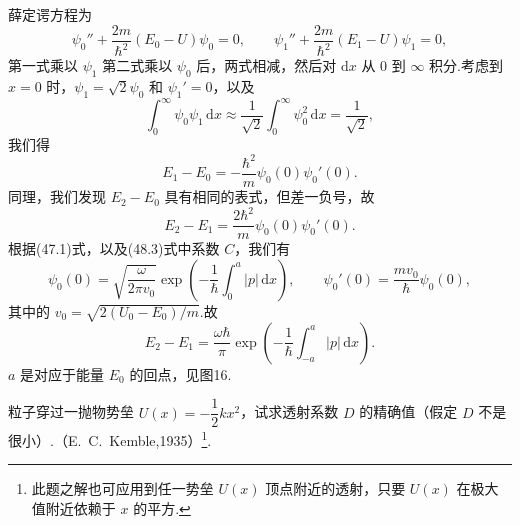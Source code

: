 \begin{xiti}
薛定谔方程为
\begin{equation*}
  \psi_0''+\frac{2m}{\hbar^2}(E_0-U)\psi_0=0,\qquad
  \psi_1''+\frac{2m}{\hbar^2}(E_1-U)\psi_1=0,
\end{equation*}
第一式乘以 $\psi_1$ 第二式乘以 $\psi_0$ 后，两式相减，然后对 $\mathrm{d}x$ 从 0 到 $\infty$ 积分.考虑到 $x=0$ 时，$\psi_1=\sqrt{2}\psi_0$ 和 $\psi_1'=0$，以及
\begin{equation*}
  \int_0^{\infty}\psi_0\psi_1\,\mathrm{d}x
  \approx\frac{1}{\sqrt{2}}\int_0^{\infty}\psi_0^2\,\mathrm{d}x
  =\frac{1}{\sqrt{2}},
\end{equation*}
我们得
\begin{equation*}
  E_1-E_0=-\frac{\hbar^2}{m}\psi_0(0)\psi_0'(0).
\end{equation*}
同理，我们发现 $E_2-E_0$ 具有相同的表式，但差一负号，故
\begin{equation*}
  E_2-E_1=\frac{2\hbar^2}{m}\psi_0(0)\psi_0'(0).
\end{equation*}
根据(47.1)式，以及(48.3)式中系数 $C$，我们有
\begin{equation*}
  \psi_0(0)=\sqrt{\frac{\omega}{2\pi v_0}}
  \exp\left(-\frac{1}{\hbar}\int_0^a|p|\,\mathrm{d}x\right),\qquad
  \psi_0'(0)=\frac{mv_0}{\hbar}\psi_0(0),
\end{equation*}
其中的 $v_0=\sqrt{2(U_0-E_0)/m}$.故
\begin{equation*}
  E_2-E_1=\frac{\omega\hbar}{\pi}
  \exp\left(-\frac{1}{\hbar}\int_{-a}^a|p|\,\mathrm{d}x\right).
\end{equation*}
$a$ 是对应于能量 $E_0$ 的回点，见图16.

\quad 粒子穿过一抛物势垒 $U(x)=-\dfrac{1}{2}kx^2$，试求透射系数 $D$ 的精确值（假定 $D$ 不是很小）.（E.~C.~Kemble,1935）\footnote{此题之解也可应用到任一势垒 $U(x)$ 顶点附近的透射，只要 $U(x)$ 在极大值附近依赖于 $x$ 的平方.}.


\end{xiti}
